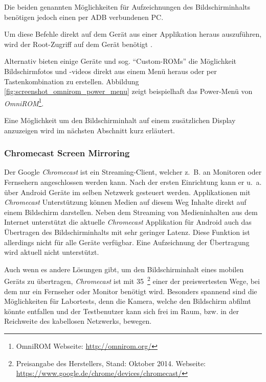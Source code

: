 Die beiden genannten Möglichkeiten für Aufzeichnungen des Bildschirminhalts benötigen jedoch einen per \ac{ADB} verbundenen PC.

Um diese Befehle direkt auf dem Gerät aus einer Applikation heraus auszuführen, wird der Root-Zugriff auf dem Gerät benötigt \cite[vgl.][22]{Erxleben.2014}.

Alternativ bieten einige Geräte und sog. \enquote{Custom-ROMs} die Möglichkeit Bildschirmfotos und -videos direkt aus einem Menü heraus oder per Tastenkombination zu erstellen. 
Abbildung \ref{fig:screenshot_omnirom_power_menu} zeigt beispielhaft das Power-Menü von \emph{OmniROM}\footnote{OmniROM Webseite: \url{http://omnirom.org/}}.

Eine Möglichkeit um den Bildschirminhalt auf einem zusätzlichen Display anzuzeigen wird im nächsten Abschnitt kurz erläutert.

\subsubsection{Chromecast Screen Mirroring}
Der Google \emph{Chromecast} ist ein Streaming-Client, welcher z.~B. an Monitoren oder Fernsehern angeschlossen werden kann.
Nach der ersten Einrichtung kann er u.~a. über Android Geräte im selben Netzwerk gesteuert werden.
Applikationen mit \emph{Chromecast} Unterstützung können Medien auf diesem Weg Inhalte direkt auf einem Bildschirm darstellen. \cite[Vgl.][]{Google.2014}
Neben dem Streaming von Medieninhalten aus dem Internet unterstützt die aktuelle \emph{Chromecast} Applikation für Android \cite{GoogleInc..2014} auch das Übertragen des Bildschirminhalts mit sehr geringer Latenz.
Diese Funktion ist allerdings nicht für alle Geräte verfügbar.
Eine Aufzeichnung der Übertragung wird aktuell nicht unterstützt.

Auch wenn es andere Lösungen gibt, um den Bildschirminhalt eines mobilen Geräts zu übertragen, \emph{Chromecast} ist mit 35~\texteuro\xspace \footnote{Preisangabe des Herstellers, Stand: Oktober 2014. Webseite: \url{https://www.google.de/chrome/devices/chromecast/}} einer der preiswertesten Wege, bei dem nur ein Fernseher oder Monitor benötigt wird.
Besonders spannend sind die Möglichkeiten für Labortests, denn die Kamera, welche den Bildschirm abfilmt könnte entfallen und der Testbenutzer kann sich frei im Raum, bzw. in der Reichweite des kabellosen Netzwerks, bewegen.